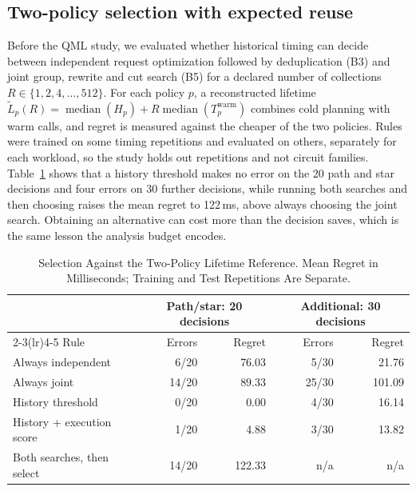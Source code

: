 \subsection{Two-policy selection with expected reuse}
Before the QML study, we evaluated whether historical timing can decide between independent request optimization followed by deduplication (B3) and joint group, rewrite and cut search (B5) for a declared number of collections $R\in\{1,2,4,\dots,512\}$. For each policy $p$, a reconstructed lifetime $\widetilde L_p(R)=\operatorname{median}(H_p)+R\operatorname{median}(T^{\mathrm{warm}}_p)$ combines cold planning with warm calls, and regret is measured against the cheaper of the two policies. Rules were trained on some timing repetitions and evaluated on others, separately for each workload, so the study holds out repetitions and not circuit families. Table~\ref{tab:selection_quality} shows that a history threshold makes no error on the 20 path and star decisions and four errors on 30 further decisions, while running both searches and then choosing raises the mean regret to 122\,ms, above always choosing the joint search. Obtaining an alternative can cost more than the decision saves, which is the same lesson the analysis budget encodes.

\begin{table}[!t]
\caption{Selection Against the Two-Policy Lifetime Reference. Mean Regret in Milliseconds; Training and Test Repetitions Are Separate.}
\label{tab:selection_quality}
\centering
\setlength{\tabcolsep}{2pt}
\footnotesize
\begin{tabular}{lrrrr}
\toprule
 & \multicolumn{2}{c}{Path/star: 20 decisions} & \multicolumn{2}{c}{Additional: 30 decisions}\\
\cmidrule(lr){2-3}\cmidrule(lr){4-5}
Rule & Errors & Regret & Errors & Regret\\
\midrule
Always independent & 6/20 & 76.03 & 5/30 & 21.76\\
Always joint & 14/20 & 89.33 & 25/30 & 101.09\\
History threshold & 0/20 & 0.00 & 4/30 & 16.14\\
History + execution score & 1/20 & 4.88 & 3/30 & 13.82\\
Both searches, then select & 14/20 & 122.33 & n/a & n/a\\
\bottomrule
\end{tabular}
\end{table}

